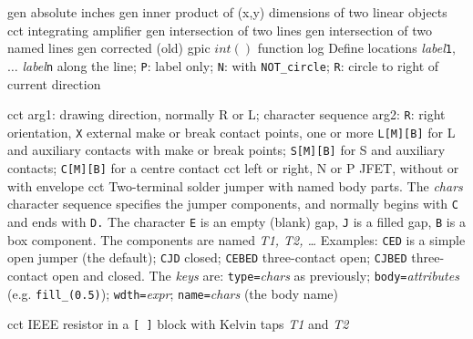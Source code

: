 %
  {gen}%
  {absolute inches}%
%
  {gen}%
  {inner product of (x,y) dimensions of two linear objects}%
%
  {cct}%
  {integrating amplifier}%
%
  {gen}%
  {intersection of two lines}%
%
  {gen}%
  {intersection of two named lines}%
%
  {gen}%
  {corrected (old) gpic $int()$ function}%
%
  {log}%
  {Define locations {\sl label}{\tt 1}, $\ldots$ {\sl label}{\tt n}
    along the line; {\tt P}: label only;
    {\tt N}: with {\tt NOT\_circle};
    {\tt R}: circle to right of current direction }%

%

%
  {cct}%
  {arg1: drawing direction, normally R or L;
   character sequence arg2: {\tt R}: right orientation,
   {\tt X} external make or break contact points,
   one or more {\tt L[M][B]} for L and auxiliary contacts with make or break
   points; {\tt S[M][B]} for S and auxiliary contacts;
   {\tt C[M][B]} for a centre contact
   }%
%
  {cct}%
  {left or right, N or P JFET, without or with envelope
    }%
%
  {cct}%
  { Two-terminal solder jumper with named body parts.
    The {\sl chars} character sequence specifies the jumper components,
    and normally begins with {\tt C} and ends with {\tt D.} The character
    {\tt E} is an empty (blank) gap, {\tt J} is a filled gap, {\tt B}
    is a box component.  The components are named {\sl T1, T2, \ldots}
    Examples: {\tt CED} is a simple open jumper (the default); {\tt CJD}
    closed; {\tt CEBED} three-contact open; {\tt CJBED} three-contact
    open and closed.
    The {\sl keys} are: {\tt type=}{\sl chars} as previously;
                        {\tt body=}{\sl attributes} (e.g. {\tt fill\_(0.5)});
                        {\tt wdth=}{\sl expr};
                        {\tt name=}{\sl chars} (the body name)%
}%

%

%
  {cct}%
  {IEEE resistor in a {\tt [ ]} block with Kelvin taps {\sl T1} and {\sl T2}
   }%

